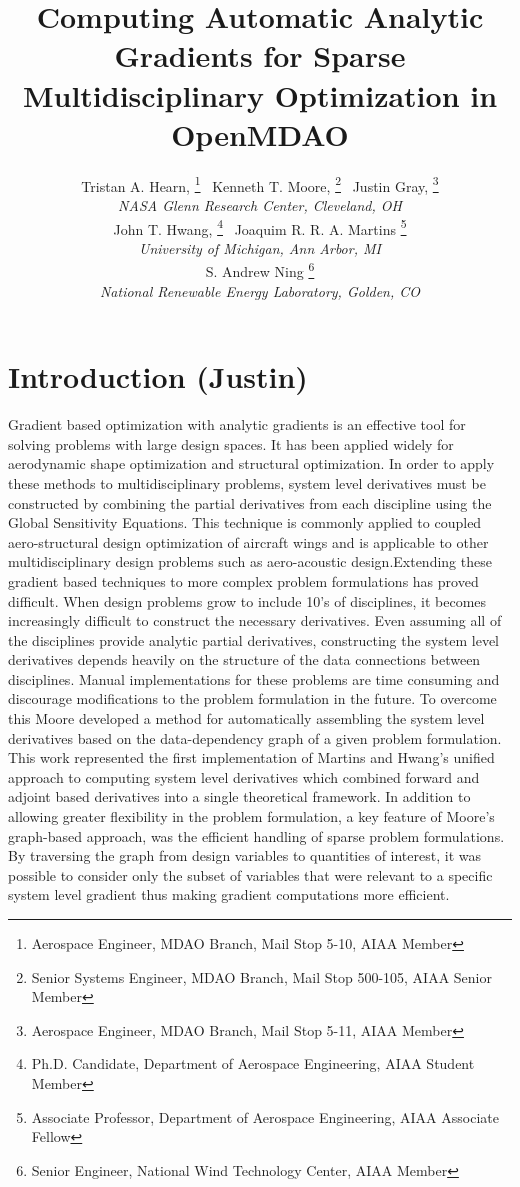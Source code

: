 \documentclass[]{aiaa-tc} %
\title{Computing Automatic Analytic Gradients for Sparse Multidisciplinary Optimization in OpenMDAO}
\author{
  Tristan A. Hearn,%
     \thanks{Aerospace Engineer, MDAO Branch, Mail Stop 5-10, AIAA Member}
  \ Kenneth T. Moore,%
     \thanks{Senior Systems Engineer, MDAO Branch, Mail Stop 500-105, AIAA Senior Member}
  \ Justin Gray,%
     \thanks{Aerospace Engineer, MDAO Branch, Mail Stop 5-11, AIAA Member}
   \\
  {\normalsize\itshape
  NASA Glenn Research Center, Cleveland, OH}  \\
  John T. Hwang,%
  \thanks{Ph.D. Candidate, Department of Aerospace Engineering, AIAA Student Member}
  \ Joaquim R. R. A. Martins%
  \thanks{Associate Professor, Department of Aerospace Engineering, AIAA Associate Fellow}
  \\
  {\normalsize\itshape
   University of Michigan, Ann Arbor, MI}\\
  S. Andrew Ning
    \thanks{Senior Engineer, National Wind Technology Center, AIAA Member}
  \\
  {\normalsize\itshape
   National Renewable Energy Laboratory, Golden, CO}
}
\begin{document}
  \maketitle

  \begin{abstract}

  \end{abstract}

  \section{Introduction (Justin)}

    Gradient based optimization with analytic gradients is an effective tool for solving problems
    with large design spaces. It has been applied widely for aerodynamic shape optimization \cite{Liou2010,palacios2012adjoint}
    and structural optimization\cite{Kennedy:2013:TACS, Venkataraman:2004:SOC, Adelman:1986:structure-sensitivity}.
    In order to apply these methods to multidisciplinary problems, system level derivatives must be
    constructed by combining the partial derivatives from each discipline using the Global Sensitivity
    Equations\cite{Sobieski1990}. This technique is commonly applied to coupled
    aero-structural design optimization of aircraft wings\cite{Kenway2012c, Haghighat2012} and is applicable to
    other multidisciplinary design problems such as aero-acoustic design\cite{economon2012coupled}.Extending these
    gradient based techniques to more complex problem formulations has proved difficult. When
    design problems grow to include 10's of disciplines, it becomes increasingly difficult to construct the
    necessary derivatives. Even assuming all of the disciplines provide analytic partial derivatives,
    constructing the system level derivatives depends heavily on the structure of the data connections
    between disciplines. Manual implementations for these problems are time consuming and discourage modifications
    to the problem formulation in the future. To overcome this Moore developed a method for automatically assembling the system
    level derivatives based on the data-dependency graph of a given problem formulation\cite{openmdao_derivatives}. This
    work represented the first implementation of Martins and Hwang's unified approach to computing system level derivatives
    which combined forward and adjoint based derivatives into a single theoretical framework\cite{martins2013}. 
    In addition to allowing greater flexibility in the problem formulation, a key feature of Moore's graph-based approach, was the efficient
    handling of sparse problem formulations. By traversing the graph from design variables to quantities of interest,
    it was possible to consider only the subset of variables that were relevant to a specific system level gradient thus
    making gradient computations more efficient.
\end{document}
